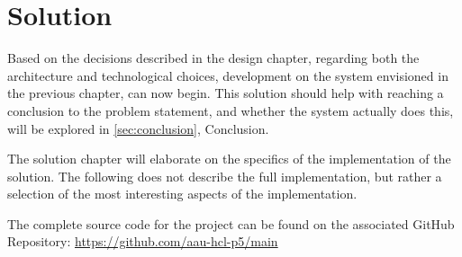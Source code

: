 \chapter{Solution}

Based on the decisions described in the design chapter, regarding both the architecture and technological choices, development on the system envisioned in the previous chapter, can now begin.
This solution should help with reaching a conclusion to the problem statement, and whether the system actually does this, will be explored in \autoref{sec:conclusion}, Conclusion.

The solution chapter will elaborate on the specifics of the implementation of the solution.
The following does not describe the full implementation, but rather a selection of the most interesting aspects of the implementation.

The complete source code for the project can be found on the associated GitHub Repository: \url{https://github.com/aau-hcl-p5/main}







%








